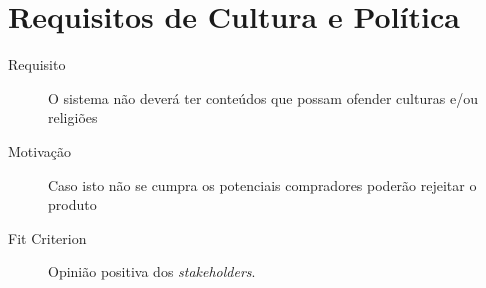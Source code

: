 

\section{Requisitos de Cultura e Política}
\begin{description}
\item[Requisito] O sistema não deverá ter conteúdos que possam ofender culturas e/ou religiões 
\item[Motivação] Caso isto não se cumpra os potenciais compradores poderão rejeitar o produto
\item[Fit Criterion] Opinião positiva dos \emph{stakeholders}.
\end{description}

